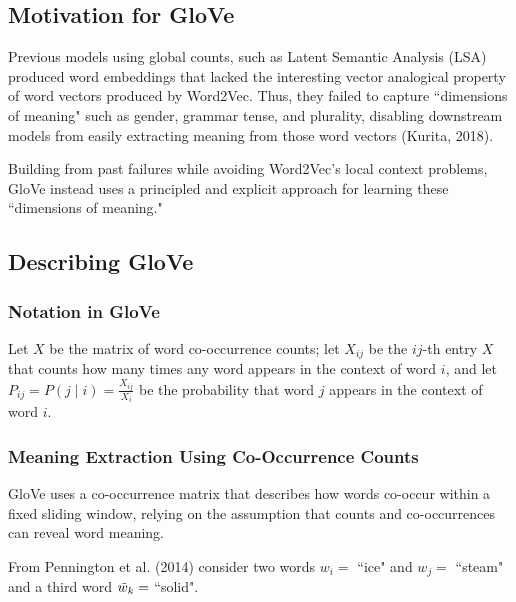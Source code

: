 \subsection{Motivation for GloVe}

Previous models using global counts, such as Latent Semantic Analysis (LSA) produced word embeddings that lacked the interesting vector analogical property of word vectors produced by Word2Vec. Thus, they failed to capture ``dimensions of meaning" such as gender, grammar tense, and plurality, disabling downstream models from easily extracting meaning from those word vectors (Kurita, 2018). 

Building from past failures while avoiding Word2Vec's local context problems, GloVe instead uses a principled and explicit approach for learning these ``dimensions of meaning."


\subsection{Describing GloVe}

\subsubsection{Notation in GloVe}

Let $X$ be the matrix of word co-occurrence counts; let $X_{ij}$ be the $ij$-th entry $X$ that counts how many times any word appears in the context of word $i$, and let $P_{ij} = P(j \; | \; i) = \frac {X_{ij}} {X_i}$ be the probability that word $j$ appears in the context of word $i$. 

\subsubsection{Meaning Extraction Using Co-Occurrence Counts}

GloVe uses a co-occurrence matrix that describes how words co-occur within a fixed sliding window, relying on the assumption that counts and co-occurrences can reveal word meaning. 

From Pennington et al. (2014) consider two words $w_i =$ ``ice" and $w_j = $ ``steam" and a third word $\Tilde{w}_k =$ ``solid". 